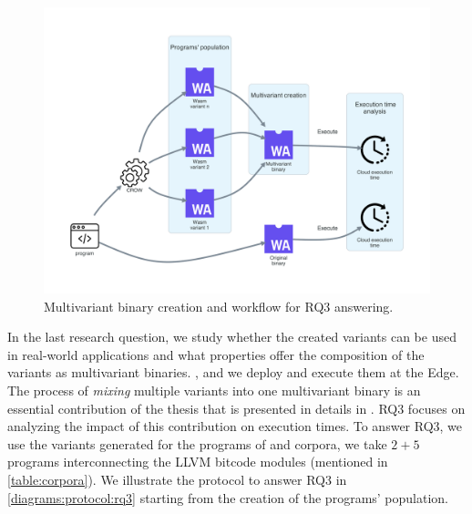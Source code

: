 
\section{\rqthree}
\label{rq3:method}




\newcommand{\mewe}{MEWE\xspace}

\begin{figure}[h]
    \centering
    \includegraphics[width=0.8\linewidth]{diagrams/Rq3.pdf}
    \caption{Multivariant binary creation and workflow for RQ3 answering.}
    \label{diagrams:protocol:rq3}
\end{figure}

In the last research question, we study whether the created variants can be used in real-world applications and what properties offer the composition of the variants as multivariant binaries. , and we deploy and execute them at the Edge. The process of \emph{mixing} multiple variants into one multivariant binary is an essential contribution of the thesis that is presented in details in \cite{2021arXiv210808125C}. RQ3 focuses on analyzing the impact of this contribution on execution times. To answer RQ3, we use the variants generated for the programs of \corpussodium and \corpusqrcode corpora, we take $2 + 5$ programs interconnecting the LLVM bitcode modules (mentioned in \autoref{table:corpora}). We illustrate the protocol to answer RQ3 in \autoref{diagrams:protocol:rq3} starting from the creation of the programs' population.




